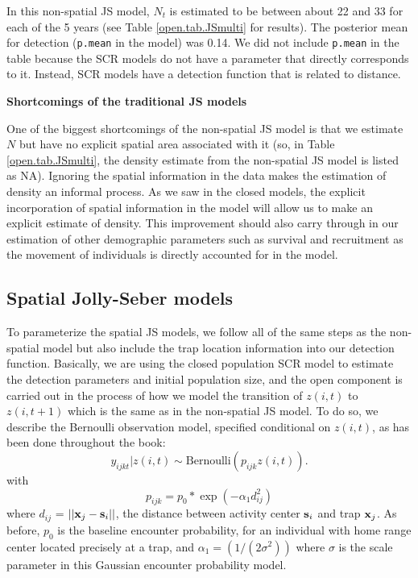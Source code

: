 In this non-spatial JS model, $N_t$ is estimated to be between about
22 and 33 for each of the 5 years (see Table \ref{open.tab.JSmulti}
for results).  The posterior mean for detection (\mbox{\tt p.mean} in
the model) was 0.14.  We did not include \mbox{\tt p.mean} in the
table because the SCR models do not have a parameter that directly
corresponds to it.  Instead, SCR models have a detection function that
is related to distance.


{\flushleft \bf Shortcomings of the traditional JS models}

One of the biggest shortcomings of the non-spatial JS model is that we
estimate $N$ but have no explicit spatial area associated with it (so,
in Table \ref{open.tab.JSmulti}, the density estimate from the
non-spatial JS model is listed as NA).  Ignoring the spatial
information in the data makes the estimation of density an informal
process.  As we saw in the closed models, the explicit incorporation
of spatial information in the model will allow us to make an explicit
estimate of density.  This improvement should also carry through in
our estimation of other demographic parameters such as survival and
recruitment as the movement of individuals is directly accounted for
in the model.


\subsection{Spatial Jolly-Seber models}

To parameterize the spatial JS models, we follow all of the same steps
as the non-spatial model but also include the trap location
information into our detection function.  Basically, we are using the
closed population SCR model to estimate the detection parameters and
initial population size, and the open component is carried out in the
process of how we model the transition of $z(i,t)$ to $z(i, t+1)$
which is the same as in the non-spatial JS model.  To do so, we
describe the Bernoulli observation model, specified conditional on
$z(i,t)$, as has been done throughout the book:
\[
  y_{ijkt}|z(i,t) \sim
\mbox{Bernoulli}(p_{ijk} z(i,t)).
\]
with
\begin{equation}
p_{ijk} = p_{0}*\exp(-\alpha_{1} d_{ij}^2)
\label{scr0.eq.norm}
\end{equation}
where $d_{ij}$ = $||{\bf x}_{j}-{\bf s}_{i}||$, the distance between
activity center ${\bf s}_{i}$ and trap ${\bf x}_{j}$. As before,
$p_{0}$ is the baseline encounter probability, for an individual with
home range center located precisely at a trap, and $\alpha_{1} =
(1/(2\sigma^2))$ where $\sigma$ is the scale parameter in this
Gaussian encounter probability model.


